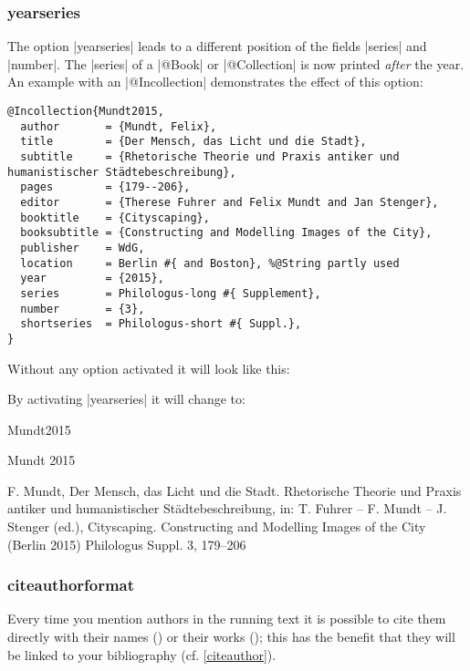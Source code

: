 \documentclass[a4paper,
10pt,
greek,
french,
spanish,
italian,
ngerman,
english
]{ltxdoc}
\begin{document}

\subsubsection{yearseries}\label{yearseries}
The option |yearseries| leads to a different position of the fields |series| and |number|.
The |series| of a |@Book| or |@Collection| is now printed \emph{after} the year.
An example with an |@Incollection| demonstrates the effect of this option:
 
\begin{lstlisting}[style=bibentry,label=Mundt2015,caption={{@}Incollection\{Mundt2015,…\}}]
@Incollection{Mundt2015,
  author       = {Mundt, Felix},
  title        = {Der Mensch, das Licht und die Stadt},
  subtitle     = {Rhetorische Theorie und Praxis antiker und humanistischer Städtebeschreibung},
  pages        = {179--206},
  editor       = {Therese Fuhrer and Felix Mundt and Jan Stenger},
  booktitle    = {Cityscaping},
  booksubtitle = {Constructing and Modelling Images of the City},
  publisher    = WdG,
  location     = Berlin #{ and Boston}, %@String partly used
  year         = {2015},
  series       = Philologus-long #{ Supplement},
  number       = {3},
  shortseries  = Philologus-short #{ Suppl.},
}
\end{lstlisting}

Without any option activated it will look like this:
 
By activating |yearseries| it will change to:
\begin{bibbsp}{Mundt2015}
\parbox[t]{1.7cm}{Mundt 2015} \parbox[t]{9cm}{F. Mundt, Der Mensch, das Licht und die Stadt. Rhetorische Theorie und Praxis antiker und humanistischer Städtebeschreibung, in: T. Fuhrer -- F. Mundt -- J. Stenger (ed.), Cityscaping. Constructing and Modelling Images of the City (Berlin 2015) {\color{red}Philologus Suppl. 3,} 179–206}
\end{bibbsp}

\subsubsection{citeauthorformat}\label{citeauthorformat}
Every time you mention authors in the running text it is possible to cite them 
directly with their names () or their works  ();
this has the benefit that they will be linked to your bibliography (cf. \cref{citeauthor}).
\end{document}
